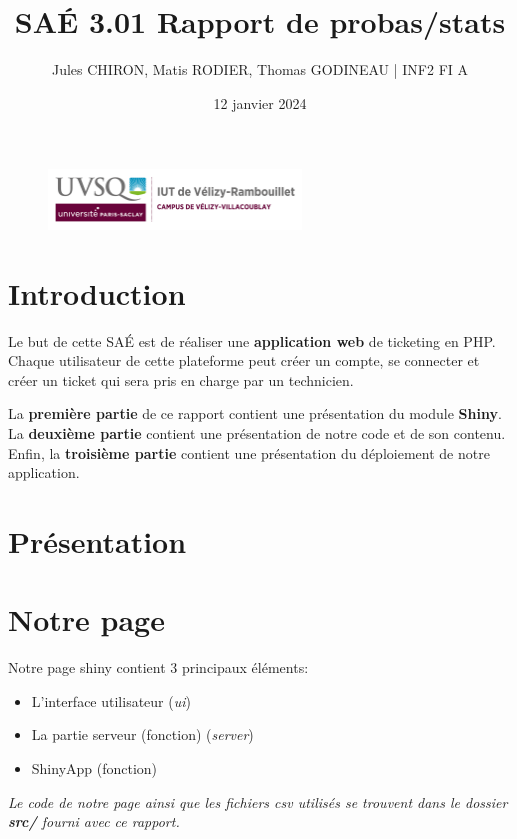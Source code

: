 \documentclass[12pt, a4paper]{article}
\title{SAÉ 3.01 Rapport de probas/stats}
\author{Jules CHIRON, Matis RODIER, Thomas GODINEAU | INF2 FI A}
\date{12 janvier 2024}
\begin{document}
\maketitle

\begin{figure}[h]
    \includegraphics[width=0.6\textwidth]{../annexes/logo_uvsq}
\end{figure}

\tableofcontents{}

\section*{Introduction}

Le but de cette SAÉ est de réaliser une \textbf{application web} de ticketing en PHP.\@
Chaque utilisateur de cette plateforme peut créer un compte, se connecter et créer un ticket qui sera pris en charge par un technicien.
\bigskip

La \textbf{première partie} de ce rapport contient une présentation du module \textbf{Shiny}.
La \textbf{deuxième partie} contient une présentation de notre code et de son contenu.
Enfin, la \textbf{troisième partie} contient une présentation du déploiement de notre application.

\section{Présentation}

\section{Notre page}

Notre page shiny contient 3 principaux éléments:
\begin{itemize}
    \item L'interface utilisateur (\textit{ui})
    \item La partie serveur (fonction) (\textit{server})
    \item ShinyApp (fonction)
\end{itemize}
\bigskip
\textit{Le code de notre page ainsi que les fichiers csv utilisés se trouvent dans le dossier \textbf{src/} fourni avec ce rapport.}
\end{document}
